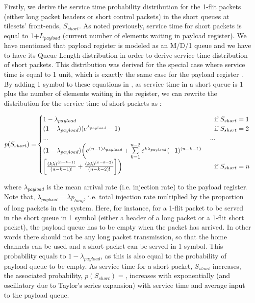 Firstly, we derive the service time probability distribution for the 1-flit packets (either long packet headers or short control packets) in the short queues at tilesets' front-ends, $S_{short}$. As noted previously, service time for short packets is equal to 1+$L_{payload}$ (current number of elements waiting in payload register). We have mentioned that payload register is modeled as an M/D/1 queue and we have to have its Queue Length distribution in order to derive service time distribution of short packets. This distribution was derived for the special case where service time is equal to 1 unit, which is exactly the same case for the payload register \cite{nakagawa2005series}. By adding 1 symbol to these equations in \cite{nakagawa2005series}, as service time in a short queue is 1 plus the number of elements waiting in the register, we can rewrite the distribution for the service time of short packets as  : 



\[ \textrm{$p(S_{short}) = $}
   \begin{cases}  
   
     \textrm{$1-\lambda_{payload}$}  & \textrm{\, \, if $S_{short} = 1$} \\
      \textrm{$(1-\lambda_{payload})(e^{\lambda_{payload}}-1)$}  & \textrm{\, \, if $S_{short} = 2$}\\
      \textrm{...}  & \, \, ...\\
     \textrm{$(1-\lambda_{payload})\bigg(e^{(n-1)\lambda_{payload}}+ \sum\limits_{k=1}^{n-2}e^{k\lambda_{payload}}(-1)^{(n-k-1)}$}  & \\
     
    \textrm{$\bigg[\frac{(k\lambda)^{(n-k-1)}}{(n-k-1)!} + \frac{(k\lambda)^{(n-k-2)}}{(n-k-2)!}  \bigg] \bigg)$}  & \textrm{\, \, if $S_{short} = n$}
   
   \end{cases} 
\]

where $\lambda_{payload}$ is the mean arrival rate (i.e. injection rate) to the payload register. Note that, $\lambda_{payload} = \lambda p_{long}$, i.e. total injection rate multiplied by the proportion of long packets in the system. Here, for instance, for a 1-flit packet to be served in the short queue in 1 symbol (either a header of a long packet or a 1-flit short packet), the payload queue has to be empty when the packet has arrived. In other words there should not be any long packet transmission, so that the home channels can be used and a short packet can be served in 1 symbol. This probability equals to $1-\lambda_{payload}$, as this is also equal to the probability of payload queue to be empty. As service time for a short packet, $S_{short}$ increases, the associated probability, $p(S_{short}) = $, increases with exponentially (and oscillatory due to Taylor's series expansion) with service time and average input to the payload queue. 

